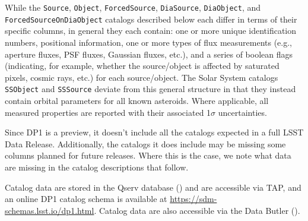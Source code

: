 While the \texttt{Source}, \texttt{Object}, \texttt{ForcedSource}, \texttt{DiaSource}, \texttt{DiaObject}, and \texttt{ForcedSourceOnDiaObject} catalogs described below each differ in terms of their specific columns, in general they each contain: one or more unique identification numbers, positional information, one or more types of \gls{flux} measurements (e.g., aperture fluxes, \gls{PSF} fluxes, Gaussian fluxes, etc.), and a series of boolean flags (indicating, for example, whether the source/object is affected by saturated pixels, cosmic rays, etc.) for each source/object.
The Solar System catalogs \texttt{SSObject} and \texttt{SSSource} deviate from this general structure in that they instead contain orbital parameters for all known asteroids.
Where applicable, all measured properties are reported with their associated 1$\sigma$ uncertainties.

Since \gls{DP1} is a preview, it doesn't include all the catalogs expected in a full \gls{LSST} \gls{Data Release}. Additionally, the catalogs it does include may be missing some columns planned for future releases.
Where this is the case, we note what data are missing in the catalog descriptions that follow.

Catalog data are stored in the \gls{Qserv} database () and are accessible via \gls{TAP}, and an online \gls{DP1} catalog \gls{schema} is available at \url{https://sdm-schemas.lsst.io/dp1.html}.
Catalog data are also accessible via the Data \gls{Butler} ().

